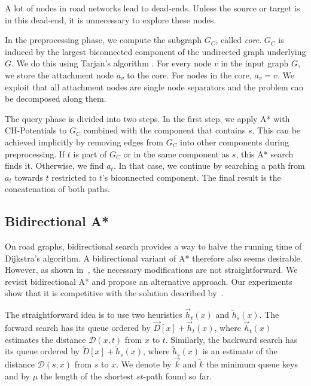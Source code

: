 \documentclass[manuscript,review]{acmart}
\newcommand*{\dist}{\mathcal{D}}
\begin{document}
A lot of nodes in road networks lead to dead-ends.
Unless the source or target is in this dead-end, it is unnecessary to explore these nodes.

In the preprocessing phase, we compute the subgraph $G_C$, called \emph{core}.
$G_C$ is induced by the largest biconnected component of the undirected graph underlying $G$.
We do this using Tarjan's algorithm \cite{t-dfslg2-72}.
For every node $v$ in the input graph $G$, we store the attachment node $a_v$ to the core.
For nodes in the core, $a_v=v$.
We exploit that all attachment nodes are single node separators and the problem can be decomposed along them.

The query phase is divided into two steps.
In the first step, we apply A* with CH-Potentials to $G_C$ combined with the component that contains $s$.
This can be achieved implicitly by removing edges from $G_C$ into other components during preprocessing.
If $t$ is part of $G_C$ or in the same component as $s$, this A* search finds it.
Otherwise, we find $a_t$.
In that case, we continue by searching a path from $a_t$ towards $t$ restricted to $t$'s biconnected component.
The final result is the concatenation of both paths.

\subsection{Bidirectional A*}\label{sec:bidir_astar}

On road graphs, bidirectional search provides a way to halve the running time of Dijkstra's algorithm.
A bidirectional variant of A* therefore also seems desirable.
However, as shown in~\cite{gh-cspas-05}, the necessary modifications are not straightforward.
We revisit bidirectional A* and propose an alternative approach.
Our experiments show that it is competitive with the solution described by~\cite{gh-cspas-05}.

The straightforward idea is to use two heuristics $\overrightarrow{h}_t(x)$ and $\overleftarrow{h}_s(x)$.
The forward search has its queue ordered by $\overrightarrow{D}[x] + \overrightarrow{h}_t(x)$, where $\overrightarrow{h}_t(x)$ estimates the distance $\dist(x,t)$ from $x$ to $t$.
Similarly, the backward search has its queue ordered by $\overleftarrow{D}[x] + \overleftarrow{h}_s(x)$, where $\overleftarrow{h}_s(x)$ is an estimate of the distance $\dist(s,x)$ from $s$ to $x$.
We denote by $\overrightarrow{k}$ and $\overleftarrow{k}$ the minimum queue keys and by $\mu$ the length of the shortest $st$-path found so far.
\end{document}
